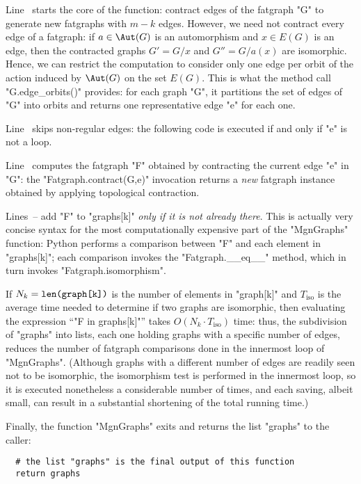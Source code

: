 Line~ starts the core of the function: contract edges
of the fatgraph "G" to generate new fatgraphs with $m-k$ edges.
However, we need not contract every edge of a fatgraph: if $a \in
\Aut(G)$ is an automorphism and $x \in E(G)$ is an edge, then the
contracted graphs $G' = G/x$ and $G'' = G/a(x)$ are isomorphic.
Hence, we can restrict the computation to consider only one edge per
orbit of the action induced by $\Aut(G)$ on the set $E(G)$. This is
what the method call "G.edge_orbits()" provides: for each graph "G",
it partitions the set of edges of "G" into orbits and returns one
representative edge "e" for each one.

Line~ skips non-regular edges: the following code is
executed if and only if "e" is not a loop.

Line~ computes the fatgraph "F" obtained by
contracting the current edge "e" in "G": the "Fatgraph.contract(G,e)"
invocation returns a \emph{new} fatgraph instance obtained by applying
topological contraction.

Lines~-- add "F" to "graphs[k]"
\emph{only if it is not already there}.  This is actually very concise
syntax for the most computationally expensive part of the "MgnGraphs"
function: Python performs a comparison between "F" and each element in
"graphs[k]"; each comparison invokes the "Fatgraph.__eq__" method,
which in turn invokes "Fatgraph.isomorphism".

If $N_k = \text{{\ttfamily len(graph[k])}}$ is the number of elements in
"graph[k]" and $T_\text{iso}$ is the average time needed to
determine if two graphs are isomorphic, then evaluating the expression
``"F in graphs[k]"'' takes $O(N_k \cdot T_\text{iso})$ time: thus, the
subdivision of "graphs" into lists, each one holding graphs with a
specific number of edges, reduces the number of fatgraph comparisons
done in the innermost loop of "MgnGraphs".  (Although graphs with a
different number of edges are readily seen not to be isomorphic, the
isomorphism test is performed in the innermost loop, so it is executed
nonetheless a considerable number of times, and each saving, albeit
small, can result in a substantial shortening of the total running
time.)

Finally, the function "MgnGraphs" exits and returns the list "graphs"
to the caller:
\begin{lstlisting}
  # the list "graphs" is the final output of this function
  return graphs
\end{lstlisting}

